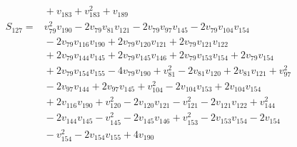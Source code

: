 \documentclass[11pt]{article}
\begin{document}
\begin{align*}
&{}+v_{183}+v_{183}^{2}+v_{189}\\
S_{127}={}&v_{79}^{2}v_{190}-2v_{79}v_{81}v_{121}-2v_{79}v_{97}v_{145}-2v_{79}v_{104}v_{154}\\
&{}-2v_{79}v_{116}v_{190}+2v_{79}v_{120}v_{121}+2v_{79}v_{121}v_{122}\\
&{}+2v_{79}v_{144}v_{145}+2v_{79}v_{145}v_{146}+2v_{79}v_{153}v_{154}+2v_{79}v_{154}\\
&{}+2v_{79}v_{154}v_{155}-4v_{79}v_{190}+v_{81}^{2}-2v_{81}v_{120}+2v_{81}v_{121}+v_{97}^{2}\\
&{}-2v_{97}v_{144}+2v_{97}v_{145}+v_{104}^{2}-2v_{104}v_{153}+2v_{104}v_{154}\\
&{}+2v_{116}v_{190}+v_{120}^{2}-2v_{120}v_{121}-v_{121}^{2}-2v_{121}v_{122}+v_{144}^{2}\\
&{}-2v_{144}v_{145}-v_{145}^{2}-2v_{145}v_{146}+v_{153}^{2}-2v_{153}v_{154}-2v_{154}\\
&{}-v_{154}^{2}-2v_{154}v_{155}+4v_{190}\\
\end{align*}
\endgroup
\end{document}
